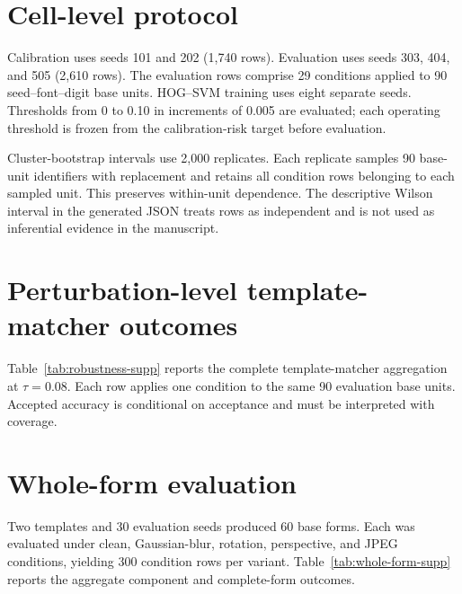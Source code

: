 \documentclass[10pt]{article}
\begin{document}
\section{Cell-level protocol}
Calibration uses seeds 101 and 202 (1,740 rows). Evaluation uses seeds 303, 404, and 505 (2,610 rows). The evaluation rows comprise 29 conditions applied to 90 seed--font--digit base units. HOG--SVM training uses eight separate seeds. Thresholds from 0 to 0.10 in increments of 0.005 are evaluated; each operating threshold is frozen from the calibration-risk target before evaluation.

Cluster-bootstrap intervals use 2,000 replicates. Each replicate samples 90 base-unit identifiers with replacement and retains all condition rows belonging to each sampled unit. This preserves within-unit dependence. The descriptive Wilson interval in the generated JSON treats rows as independent and is not used as inferential evidence in the manuscript.

\section{Perturbation-level template-matcher outcomes}
Table~\ref{tab:robustness-supp} reports the complete template-matcher aggregation at $\tau=0.08$. Each row applies one condition to the same 90 evaluation base units. Accepted accuracy is conditional on acceptance and must be interpreted with coverage.

\begin{table}[ht]
\centering
\caption{Coverage and conditional accepted accuracy by perturbation.}
\label{tab:robustness-supp}
\small

\end{table}

\section{Whole-form evaluation}
Two templates and 30 evaluation seeds produced 60 base forms. Each was evaluated under clean, Gaussian-blur, rotation, perspective, and JPEG conditions, yielding 300 condition rows per variant. Table~\ref{tab:whole-form-supp} reports the aggregate component and complete-form outcomes.

\begin{table}[ht]
\centering
\caption{Whole-form pipeline and component-suppression analysis.}
\label{tab:whole-form-supp}

\end{table}
\end{document}
